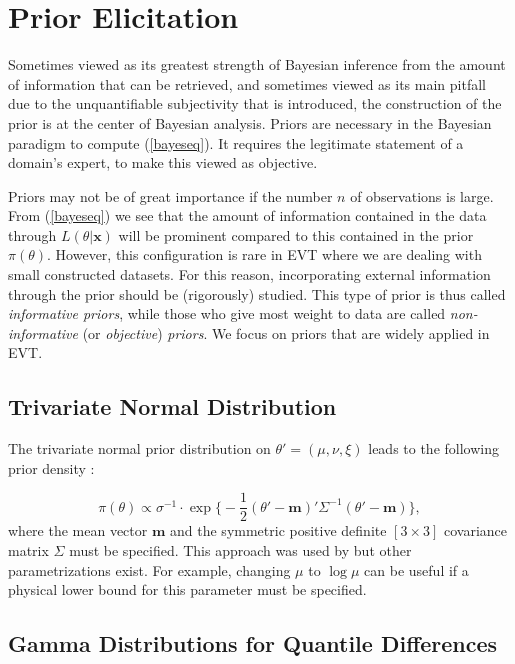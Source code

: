 \section{Prior Elicitation}\label{sec:prior}


Sometimes viewed as its greatest strength of Bayesian inference from the amount of information that can be retrieved, and sometimes viewed as its main pitfall due to the unquantifiable subjectivity that is introduced, the construction of the prior is at the center of Bayesian analysis.
Priors are necessary in the Bayesian paradigm to compute (\ref{bayeseq}). It requires the legitimate statement of a domain's expert, to make this viewed as objective.

Priors may not be of great importance if the number $n$ of observations is large. From (\ref{bayeseq}) we see that the amount of information contained in the data through $L(\theta|\boldsymbol{x})$ will be prominent compared to this contained in the prior $\pi(\theta)$.
However, this configuration is rare in EVT where we are dealing with small constructed datasets. For this reason, incorporating external information through the prior should be (rigorously) studied. This type of prior is thus called \emph{informative priors}, while those who give most weight to data are called \emph{non-informative} (or \emph{objective}) \emph{priors}. We focus on priors that are widely applied in EVT.




\subsection{Trivariate Normal Distribution}\label{sec:trivnorm}

The trivariate normal prior distribution on $\theta'=(\mu, \nu,\xi)$ leads to the following prior density :

\begin{equation}
\pi(\theta) \propto \sigma^{-1}\cdot \exp\bigg\{-\frac{1}{2}(\theta'-\boldsymbol{m})'\Sigma^{-1}(\theta'-\boldsymbol{m})\bigg\},
\end{equation}
where the mean vector $\boldsymbol{m}$ and the symmetric positive definite $[3\times 3]$ covariance matrix $\Sigma$ must be specified. This approach was used by \citet{coles_1996_bay} but other parametrizations exist. For example, changing $\mu$ to $\log \mu$ can be useful if a physical lower bound for this parameter must be specified.


\subsection{Gamma Distributions for Quantile Differences}

